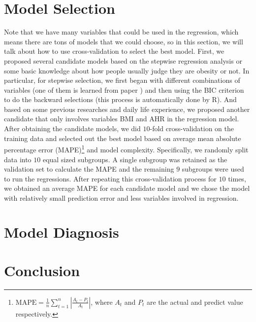 \documentclass[letterpaper,10pt]{article}
\begin{document}
\section{Model Selection}
Note that we have many variables that could be used in the regression, which means there are tons of models that we could choose, so in this section, we will talk about how to use cross-validation to select the best model. First, we proposed several candidate models based on the stepwise regression analysis or some basic knowledge about how people usually judge they are obesity or not. In particular, for stepwise selection, we first began with different combinations of variables (one of them is learned from paper \cite{development2020Zachary}) and then using the BIC criterion to do the backward selections (this process is automatically done by R). And based on some previous researches and daily life experience, we proposed another candidate that only involves variables BMI and AHR in the regression model. After obtaining the candidate models, we did $10$-fold cross-validation on the training data and selected out the best model based on average mean absolute percentage error (MAPE)\footnote{$\text{MAPE} = \frac{1}{n}\sum_{t=1}^{n}|\frac{A_t - P_t}{A_t}|$, where $A_t$ and $P_t$ are the actual and predict value respectively.} and model complexity. Specifically, we randomly split data into $10$ equal sized subgroups. A single subgroup was retained as the validation set to calculate the MAPE and the remaining $9$ subgroups were used to run the regressions. After repeating this cross-validation process for $10$ times, we obtained an average MAPE for each candidate model and we chose the model with relatively small prediction error and less variables involved in regression.
\section{Model Diagnosis}
\section{Conclusion}
\end{document}

